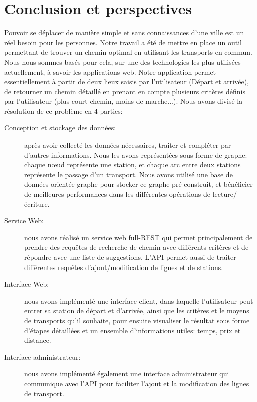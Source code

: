 \chapter{Conclusion et perspectives}

Pouvoir se déplacer de manière simple et sans connaissances d'une ville est un réel besoin pour les personnes. Notre travail a été de mettre en place un outil permettant de trouver un chemin optimal en utilisant les transports en commun.
Nous nous sommes basés pour cela, sur une des technologies les plus utilisées actuellement, à savoir les applications web.\newline
Notre application permet essentiellement à partir de deux lieux saisis par l'utilisateur (Départ et arrivée), de retourner un chemin détaillé en prenant en compte plusieurs critères définis par l'utilisateur (plus court chemin, moins de marche...).\newline
Nous avons divisé la résolution de ce problème en 4 parties:

\begin{description}
\item[Conception et stockage des données:] après avoir collecté les données nécessaires, traiter et compléter par d'autres informations. Nous les avons représentées sous forme de graphe: chaque nœud représente une station, et chaque arc entre deux stations représente le passage d'un transport.\newline
Nous avons utilisé une base de données orientée graphe pour stocker ce graphe pré-construit, et bénéficier de meilleures performances dans les différentes opérations de lecture/écriture.
\item[Service Web:] nous avons réalisé un service web full-REST qui permet principalement de prendre des requêtes de recherche de chemin avec différents critères et de répondre avec une liste de suggestions. L'API permet aussi de traiter différentes requêtes d'ajout/modification de lignes et de stations.
\item[Interface Web:]  nous avons implémenté une interface client, dans laquelle l'utilisateur peut entrer sa station de départ et d'arrivée, ainsi que les critères et le moyens de transports qu'il souhaite, pour ensuite visualiser le résultat sous forme d'étapes détaillées et un ensemble d'informations utiles: temps, prix et distance.

\item[Interface administrateur:] nous avons implémenté également une interface administrateur qui communique avec l'API pour faciliter l'ajout et la modification des lignes de transport.

\end{description}


